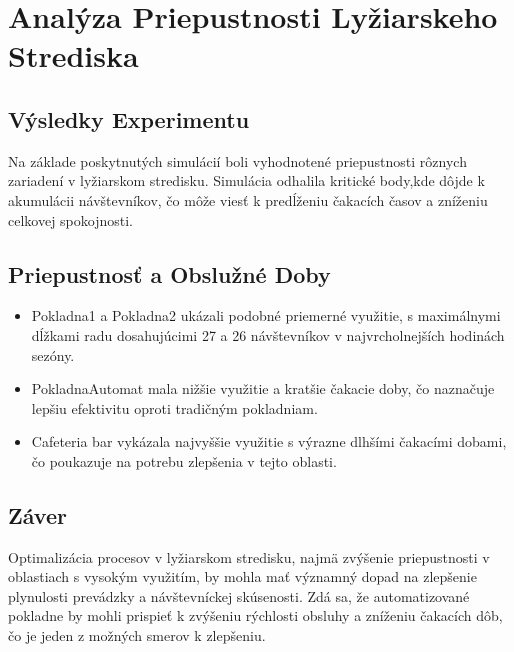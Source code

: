 ﻿

\section{Analýza Priepustnosti Lyžiarskeho Strediska}
\subsection{Výsledky Experimentu}

Na základe poskytnutých simulácií boli vyhodnotené priepustnosti rôznych zariadení v lyžiarskom stredisku.
Simulácia odhalila kritické body,kde dôjde k akumulácii návštevníkov, čo môže viesť k predĺženiu čakacích časov a zníženiu celkovej spokojnosti.

\subsection{Priepustnosť a Obslužné Doby}
\begin{itemize}
  \item Pokladna1 a Pokladna2 ukázali podobné priemerné využitie, s maximálnymi dĺžkami radu dosahujúcimi 27 a 26 návštevníkov v najvrcholnejších hodinách sezóny.
  \item PokladnaAutomat mala nižšie využitie a kratšie čakacie doby, čo naznačuje lepšiu efektivitu oproti tradičným pokladniam.
  \item Cafeteria bar vykázala najvyššie využitie s výrazne dlhšími čakacími dobami, čo poukazuje na potrebu zlepšenia v tejto oblasti.
\end{itemize}

\subsection{Záver}
Optimalizácia procesov v lyžiarskom stredisku, najmä zvýšenie priepustnosti v oblastiach s vysokým využitím, by mohla mať významný dopad na zlepšenie plynulosti prevádzky a návštevníckej skúsenosti. Zdá sa, že automatizované pokladne by mohli prispieť k zvýšeniu rýchlosti obsluhy a zníženiu čakacích dôb, čo je jeden z možných smerov k zlepšeniu.


